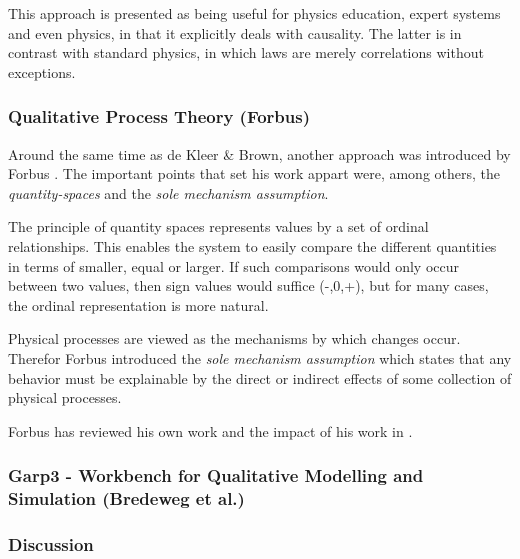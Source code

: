 \documentclass{article} %
\begin{document}
This approach is presented as being useful for physics education, expert
systems and even physics, in that it explicitly deals with causality. The
latter is in contrast with standard physics, in which laws are merely
correlations without exceptions.


\subsubsection{Qualitative Process Theory (Forbus)}

Around the same time as de Kleer \& Brown, another approach was introduced by
Forbus \cite{forbus}. The important points that set his work appart were,
among others, the \emph{quantity-spaces} and the \emph{sole mechanism
assumption}.

The principle of quantity spaces represents values by a set of ordinal
relationships. This enables the system to easily compare the different
quantities in terms of smaller, equal or larger. If such comparisons would
only occur between two values, then sign values would suffice (-,0,+), but for
many cases, the ordinal representation is more natural.

\vspace{0.8em}

Physical processes are viewed as the mechanisms by which changes occur.
Therefor Forbus introduced the \emph{sole mechanism assumption} which states
that any behavior must be explainable by the direct or indirect effects of
some collection of physical processes.

\vspace{0.8em}

Forbus has reviewed his own work and the impact of his work in
\cite{forbus12}.

\subsubsection{Garp3 - Workbench for Qualitative Modelling and Simulation
(Bredeweg et al.)}

\subsubsection{Discussion}
\end{document}
